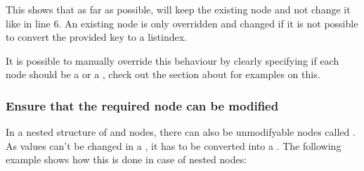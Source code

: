 \documentclass[a4paper,10pt,english]{sphinxmanual}
\begin{document}
\sphinxAtStartPar
This shows that as far as possible,  will keep the existing node and not change it like in line 6. An existing node is only overridden and changed if it is not possible to convert the provided key to a list\sphinxhyphen{}index.

\sphinxAtStartPar
It is possible to manually override this behaviour by clearly specifying if each node should be a   or a  , check out the section about {\hyperref[\detokenize{README:node-types}]{}} for examples on this.


\subsubsection{Ensure that the required node can be modified}
\label{\detokenize{README:ensure-that-the-required-node-can-be-modified}}
\sphinxAtStartPar
In a nested structure of \sphinxhyphen{} and \sphinxhyphen{}nodes, there can also be unmodifyable \sphinxhyphen{}nodes called . As values can’t be changed in a , it has to be converted into a . The following example shows how this is done in case of nested \sphinxhyphen{}nodes:

\begin{sphinxVerbatim}[commandchars=\\\{\},numbers=left,firstnumber=1,stepnumber=1]
     \PYG{p}{[}     \PYG{p}{]}
   
\end{sphinxVerbatim}
\end{document}
